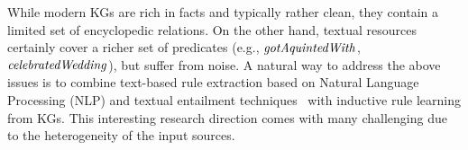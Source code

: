   While modern KGs are rich in facts and typically rather clean, they contain a limited set of encyclopedic relations. On the other hand, textual resources certainly cover a richer set of predicates (e.g., $\mathit{gotAquintedWith}$, $\mathit{celebratedWedding}$), but suffer from  noise. %
A natural way to address the %
above issues is to combine 
text-based rule extraction based on Natural Language Processing (NLP) and textual entailment techniques~\cite{Schoenmackers:2010,Gordon:2011,dragoni2016} with inductive rule learning from KGs. This interesting research direction comes with many challenging due to the heterogeneity of the input sources.


